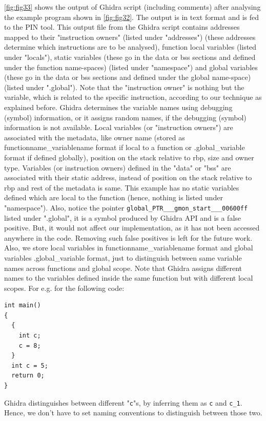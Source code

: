 \cref{fig:fig33} shows the output of Ghidra script (including comments) after analysing the example program shown in \cref{fig:fig32}. The output is in text format and is fed to the PIN tool. This output file from the Ghidra script contains addresses mapped to their "instruction owners" (listed under "addresses") (these addresses determine which instructions are to be analysed), function local variables (listed under "locals"), static variables (these go in the data or bss sections and defined under the function name-spaces) (listed under "namespace") and global variables (these go in the data or bss sections and defined under the global name-space) (listed under ".global"). Note that the "instruction owner" is nothing but the variable, which is related to the specific instruction, according to our technique as explained before. Ghidra determines the variable names using debugging (symbol) information, or it assigns random names, if the debugging (symbol) information is not available. Local variables (or "instruction owners") are associated with the metadata, like owner name (stored as functionname\_variablename format if local to a function or .global\_variable format if defined globally), position on the stack relative to rbp, size and owner type. Variables (or instruction owners) defined in the "data" or "bss" are associated with their static address, instead of position on the stack relative to rbp and rest of the metadata is same. This example has no static variables defined which are local to the function (hence, nothing is listed under "namespace"). Also, notice the pointer \texttt{global\_PTR\_\_\_gmon\_start\_\_\_00600ff} listed under ".global", it is a symbol produced by Ghidra API and is a false positive. But, it would not affect our implementation, as it has not been accessed anywhere in the code. Removing such false positives is left for the future work. Also, we store local variables in functionname\_variablename format and global variables .global\_variable format, just to distinguish between same variable names across functions and global scope. Note that Ghidra assigns different names to the variables defined inside the same function but with different local scopes. For e.g. for the following code:

\begin{lstlisting}
int main()
{
  {
    int c;
    c = 8;
  }
  int c = 5;
  return 0;
}
\end{lstlisting}
Ghidra distinguishes between different "\texttt{c}"s, by inferring them as \texttt{c} and \texttt{c\_1}. Hence, we don't have to set naming conventions to distinguish between those two.

